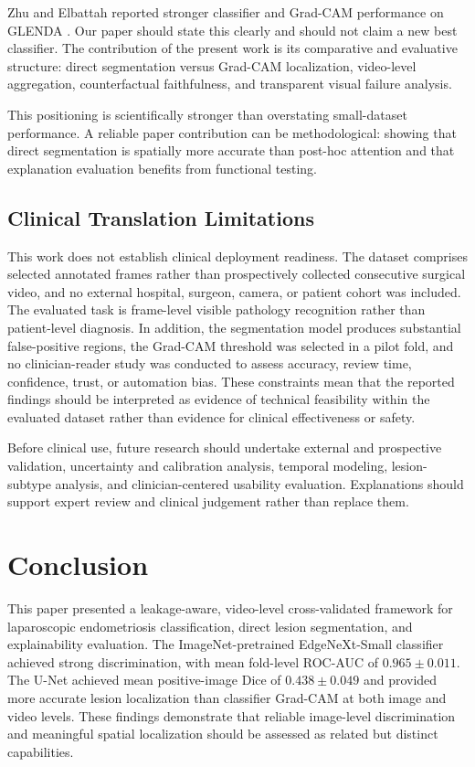 Zhu and Elbattah reported stronger classifier and Grad-CAM performance on GLENDA \cite{zhu2025xai}. Our paper should state this clearly and should not claim a new best classifier. The contribution of the present work is its comparative and evaluative structure: direct segmentation versus Grad-CAM localization, video-level aggregation, counterfactual faithfulness, and transparent visual failure analysis.

This positioning is scientifically stronger than overstating small-dataset performance. A reliable paper contribution can be methodological: showing that direct segmentation is spatially more accurate than post-hoc attention and that explanation evaluation benefits from functional testing.

\subsection{Clinical Translation Limitations}

This work does not establish clinical deployment readiness. The dataset comprises selected annotated frames rather than prospectively collected consecutive surgical video, and no external hospital, surgeon, camera, or patient cohort was included. The evaluated task is frame-level visible pathology recognition rather than patient-level diagnosis. In addition, the segmentation model produces substantial false-positive regions, the Grad-CAM threshold was selected in a pilot fold, and no clinician-reader study was conducted to assess accuracy, review time, confidence, trust, or automation bias. These constraints mean that the reported findings should be interpreted as evidence of technical feasibility within the evaluated dataset rather than evidence for clinical effectiveness or safety.

Before clinical use, future research should undertake external and prospective validation, uncertainty and calibration analysis, temporal modeling, lesion-subtype analysis, and clinician-centered usability evaluation. Explanations should support expert review and clinical judgement rather than replace them.

\section{Conclusion}

This paper presented a leakage-aware, video-level cross-validated framework for laparoscopic endometriosis classification, direct lesion segmentation, and explainability evaluation. The ImageNet-pretrained EdgeNeXt-Small classifier achieved strong discrimination, with mean fold-level ROC-AUC of $0.965\pm0.011$. The U-Net achieved mean positive-image Dice of $0.438\pm0.049$ and provided more accurate lesion localization than classifier Grad-CAM at both image and video levels. These findings demonstrate that reliable image-level discrimination and meaningful spatial localization should be assessed as related but distinct capabilities.

